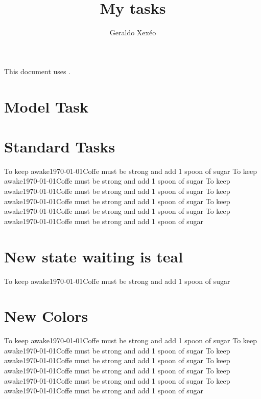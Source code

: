 \documentclass[12pt,a4paper]{article}
\author{Geraldo Xexéo}
\title{My tasks}
\begin{document}
\maketitle

This document uses \printtaskreportversion.

\section{Model Task}

\section{Standard Tasks}
%
{To keep awake}{\today}{Coffe must be strong and add 1 spoon of sugar}
%
{To keep awake}{\today}{Coffe must be strong and add 1 spoon of sugar}
%
{To keep awake}{\today}{Coffe must be strong and add 1 spoon of sugar}
%
{To keep awake}{\today}{Coffe must be strong and add 1 spoon of sugar}
%
{To keep awake}{\today}{Coffe must be strong and add 1 spoon of sugar}
%
{To keep awake}{\today}{Coffe must be strong and add 1 spoon of sugar}

\section{New state waiting is teal}

%
{To keep awake}{\today}{Coffe must be strong and add 1 spoon of sugar}


\section{New Colors}
%
{To keep awake}{\today}{Coffe must be strong and add 1 spoon of sugar}
%
{To keep awake}{\today}{Coffe must be strong and add 1 spoon of sugar}
%
{To keep awake}{\today}{Coffe must be strong and add 1 spoon of sugar}
%
{To keep awake}{\today}{Coffe must be strong and add 1 spoon of sugar}
%
{To keep awake}{\today}{Coffe must be strong and add 1 spoon of sugar}
%
{To keep awake}{\today}{Coffe must be strong and add 1 spoon of sugar}
\end{document}
